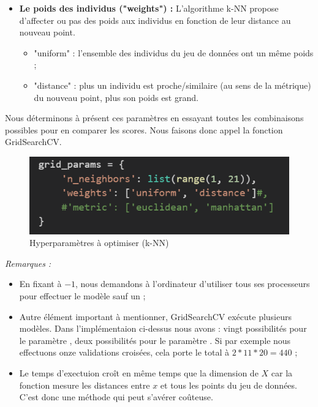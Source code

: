 \documentclass[11pt]{article}
\begin{document}
\begin{center}
\begin{itemize}
    \item \textbf{Le poids des individus ("weights") :}
    L'algorithme k-NN propose d'affecter ou pas des poids aux individus en fonction de leur distance au nouveau point.
        \begin{itemize}
        \renewcommand{\labelitemii}{-}
            \item "uniform" : l'ensemble des individus du jeu de données ont un même poids ;
            
            \item "distance" : plus un individu est proche/similaire (au sens de la métrique) du nouveau point, plus son poids est grand.
        \end{itemize}
\end{itemize}

Nous déterminons à présent ces paramètres en essayant toutes les combinaisons possibles pour en comparer les scores.
Nous faisons donc appel la fonction GridSearchCV. 

\begin{figure}[hbt!]
    \centering
    \includegraphics[width = 9 cm]{./figures/k.PNG}
    \caption{Hyperparamètres à optimiser (k-NN)}
    \label{param_opti-k-nn}
\end{figure}
\FloatBarrier

\textit{Remarques : }\par
\begin{itemize}

    \item En fixant  à $-1$, nous demandons à l'ordinateur d'utiliser tous ses processeurs pour effectuer le modèle sauf un ;{\cite{med}}

    \item Autre élément important à mentionner, GridSearchCV exécute plusieurs modèles. Dans l'implémentaion ci-dessus nous avons : vingt possibilités pour le paramètre , deux possibilités pour le paramètre . Si par exemple nous effectuons onze validations croisées, cela porte le total à $2*11*20 = 440$ ;

    \item Le temps d'exectuion croît en même temps que la dimension de $X$ car la fonction mesure les distances entre $x$ et tous les points du jeu de données. C'est donc une méthode qui peut s'avérer coûteuse.
\end{itemize}


\end{center}
\end{document}
